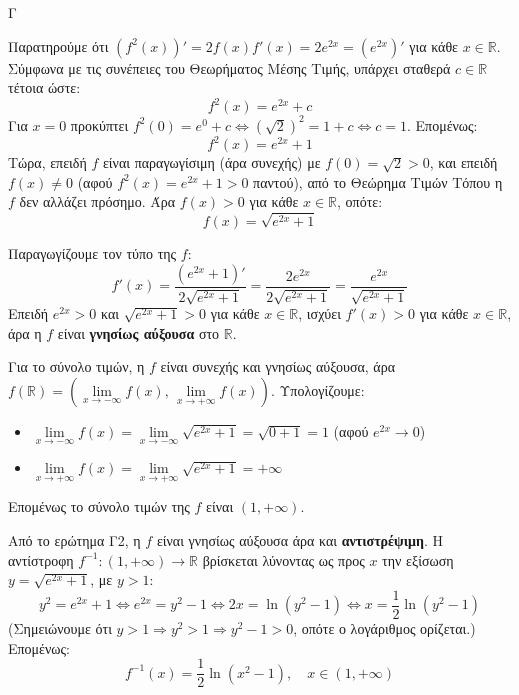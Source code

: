 \begin{thema}{Γ}
\begin{erwthma}
\item Παρατηρούμε ότι $\left(f^2(x)\right)'=2f(x)f'(x)=2e^{2x}=\left(e^{2x}\right)'$ για κάθε $x\in\mathbb{R}$. Σύμφωνα με τις συνέπειες του Θεωρήματος Μέσης Τιμής, υπάρχει σταθερά $c\in\mathbb{R}$ τέτοια ώστε:
\[f^2(x)=e^{2x}+c\]
Για $x=0$ προκύπτει $f^2(0)=e^0+c\Leftrightarrow \left(\sqrt{2}\right)^2=1+c\Leftrightarrow c=1$. Επομένως:
\[f^2(x)=e^{2x}+1\]
Τώρα, επειδή $f$ είναι παραγωγίσιμη (άρα συνεχής) με $f(0)=\sqrt{2}>0$, και επειδή $f(x)\neq 0$ (αφού $f^2(x)=e^{2x}+1>0$ παντού), από το Θεώρημα Τιμών Τόπου η $f$ δεν αλλάζει πρόσημο. Άρα $f(x)>0$ για κάθε $x\in\mathbb{R}$, οπότε:
\[f(x)=\sqrt{e^{2x}+1}\]

\item Παραγωγίζουμε τον τύπο της $f$:
\[f'(x)=\frac{\left(e^{2x}+1\right)'}{2\sqrt{e^{2x}+1}}=\frac{2e^{2x}}{2\sqrt{e^{2x}+1}}=\frac{e^{2x}}{\sqrt{e^{2x}+1}}\]
Επειδή $e^{2x}>0$ και $\sqrt{e^{2x}+1}>0$ για κάθε $x\in\mathbb{R}$, ισχύει $f'(x)>0$ για κάθε $x\in\mathbb{R}$, άρα η $f$ είναι \textbf{γνησίως αύξουσα} στο $\mathbb{R}$.

Για το σύνολο τιμών, η $f$ είναι συνεχής και γνησίως αύξουσα, άρα $f(\mathbb{R})=\left(\lim\limits_{x\to-\infty}f(x),\,\lim\limits_{x\to+\infty}f(x)\right)$. Υπολογίζουμε:
\begin{itemize}
\item $\lim\limits_{x\to-\infty}f(x)=\lim\limits_{x\to-\infty}\sqrt{e^{2x}+1}=\sqrt{0+1}=1$ \quad (αφού $e^{2x}\to 0$)
\item $\lim\limits_{x\to+\infty}f(x)=\lim\limits_{x\to+\infty}\sqrt{e^{2x}+1}=+\infty$
\end{itemize}
Επομένως το σύνολο τιμών της $f$ είναι $(1,+\infty)$.

\item Από το ερώτημα Γ2, η $f$ είναι γνησίως αύξουσα άρα και \textbf{αντιστρέψιμη}. Η αντίστροφη $f^{-1}:(1,+\infty)\to\mathbb{R}$ βρίσκεται λύνοντας ως προς $x$ την εξίσωση $y=\sqrt{e^{2x}+1}$, με $y>1$:
\[y^2=e^{2x}+1 \Leftrightarrow e^{2x}=y^2-1 \Leftrightarrow 2x=\ln(y^2-1)\Leftrightarrow x=\frac{1}{2}\ln(y^2-1)\]
(Σημειώνουμε ότι $y>1\Rightarrow y^2>1\Rightarrow y^2-1>0$, οπότε ο λογάριθμος ορίζεται.) Επομένως:
\[f^{-1}(x)=\frac{1}{2}\ln(x^2-1),\quad x\in(1,+\infty)\]


\end{erwthma}
\end{thema}
